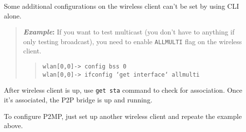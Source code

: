 \documentclass[10pt,fullpage]{article}
\newcommand{\mytt}[1]{{\texttt{#1}}}
\newcommand{\bv}{\begin{verse}}
\newcommand{\ev}{\end{verse}}
\newcommand{\clidemo}[1]{{\texttt{wlan[0,0]-> #1}}}
\newenvironment{example}{\begin{quote}\textbf{\textit{Example}:}}{\end{quote}}
\begin{document}
Some additional configurations on the wireless client can't be set 
by using CLI alone. 

\begin{example}
If you want to test multicast (you don't have to anything if only
testing broadcast), you need to enable \mytt{ALLMULTI} flag on the
wireless client.
  \bv
  \clidemo{config bss 0}\\
  \clidemo{ifconfig `get interface` allmulti}
  \ev
\end{example}

After wireless client is up, use \mytt{get sta} command to check for 
association. Once it's associated, the P2P bridge is up and running.

To configure P2MP, just set up another wireless client and repeate
the example above.
\end{document}
